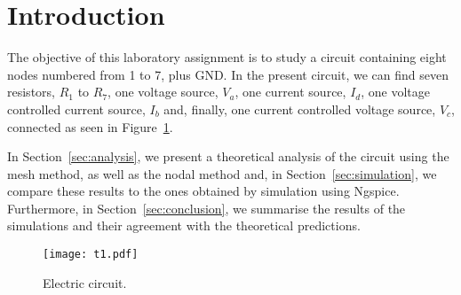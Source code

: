 \section{Introduction}
\label{sec:introduction}

The objective of this laboratory assignment is to study a circuit containing eight nodes numbered from 1 to 7, plus GND. In the present circuit, we can find seven resistors, $R_1$ to $R_7$, one voltage source, $V_a$, one current source, $I_d$, one voltage controlled current source, $I_b$ and, finally, one current controlled voltage source, $V_c$, connected as seen in Figure~\ref{fig:t1}.

In Section~\ref{sec:analysis}, we present a theoretical analysis of the circuit using the mesh method, as well as the nodal method and, in Section~\ref{sec:simulation}, we compare these results to the ones obtained by simulation using Ngspice. Furthermore, in Section~\ref{sec:conclusion}, we summarise the results of the simulations and their agreement with the theoretical predictions.

\begin{figure}[h] \centering
\texttt{[image: t1.pdf]}
\caption{Electric circuit.}
\label{fig:t1}
\end{figure}

